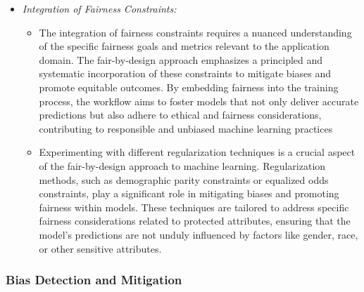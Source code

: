 \documentclass[12pt,a4paper,openright,twoside]{book}
\begin{document}
\begin{itemize}

    \item \emph{Integration of Fairness Constraints:}

    \begin{itemize}

        \item The integration of fairness constraints requires a nuanced understanding of the specific fairness goals and metrics relevant to the application domain. The fair-by-design approach emphasizes a principled and systematic incorporation of these constraints to mitigate biases and promote equitable outcomes. By embedding fairness into the training process, the workflow aims to foster models that not only deliver accurate predictions but also adhere to ethical and fairness considerations, contributing to responsible and unbiased machine learning practices

        \item Experimenting with different regularization techniques is a crucial aspect of the fair-by-design approach to machine learning. Regularization methods, such as demographic parity constraints or equalized odds constraints, play a significant role in mitigating biases and promoting fairness within models. These techniques are tailored to address specific fairness considerations related to protected attributes, ensuring that the model's predictions are not unduly influenced by factors like gender, race, or other sensitive attributes.

    \end{itemize}

\end{itemize}

\subsubsection{Bias Detection and Mitigation}
\end{document}

